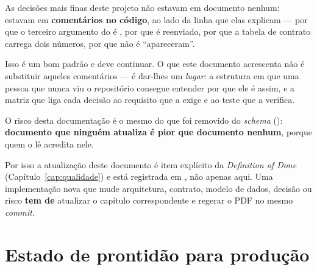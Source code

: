 \begin{nota}
As decisões mais finas deste projeto não estavam em documento nenhum: estavam em
\textbf{comentários no código}, ao lado da linha que elas explicam --- por que o
terceiro argumento do  é , por que  é
reenviado, por que a tabela de contrato carrega dois números, por que
 não é \enquote{apareceram}.

Isso é um bom padrão e deve continuar. O que este documento acrescenta não é
substituir aqueles comentários --- é dar-lhes um \emph{lugar}: a estrutura em que
uma pessoa que nunca viu o repositório consegue entender por que ele é assim, e a
matriz que liga cada decisão ao requisito que a exige e ao teste que a verifica.
\end{nota}

\begin{atencao}
O risco desta documentação é o mesmo do  que foi removido do
\emph{schema} (): \textbf{documento que ninguém atualiza é pior que
documento nenhum}, porque quem o lê acredita nele.

Por isso a atualização deste documento é item explícito da \emph{Definition of
Done} (Capítulo~\ref{cap:qualidade}) e está registrada em , não
apenas aqui. Uma implementação nova que mude arquitetura, contrato, modelo de
dados, decisão ou risco \textbf{tem de} atualizar o capítulo correspondente e
regerar o PDF no mesmo \emph{commit}.
\end{atencao}

\section{Estado de prontidão para produção}

